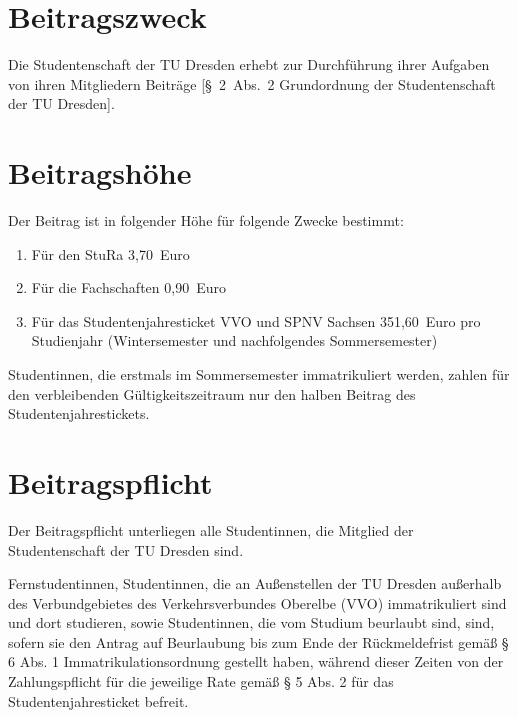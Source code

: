 

\setcounter{section}{0}
\begin{multicols}{2}
 

\section{Beitragszweck}

\Abs \Satz  Die Studentenschaft der TU Dresden erhebt zur Durchführung ihrer Aufgaben von ihren Mitgliedern Beiträge [§~2~Abs.~2 Grundordnung der Studentenschaft der TU Dresden]. 

\section{Beitragshöhe}

\Abs \Satz  Der Beitrag ist in folgender Höhe für folgende Zwecke bestimmt:
\begin{enumerate}
\item Für den StuRa 3,70~Euro
\item Für die Fachschaften 0,90~Euro
\item Für das Studentenjahresticket VVO und SPNV Sachsen 351,60~Euro pro Studienjahr (Wintersemester und nachfolgendes Sommersemester)
\end{enumerate}

\Abs \Satz  Studentinnen, die erstmals im Sommersemester immatrikuliert werden, zahlen für den verbleibenden Gültigkeitszeitraum nur den halben Beitrag des Studentenjahrestickets. 


\section{Beitragspflicht}

\Abs \Satz  Der Beitragspflicht unterliegen alle Studentinnen, die Mitglied der Studentenschaft der TU Dresden sind.

\Abs \Satz  Fernstudentinnen, Studentinnen, die an Außenstellen der TU Dresden außerhalb des Verbundgebietes des Verkehrsverbundes Oberelbe (VVO) immatrikuliert sind und dort studieren, sowie Studentinnen, die vom Studium beurlaubt sind, sind, sofern sie den Antrag auf Beurlaubung bis zum Ende der Rückmeldefrist gemäß § 6 Abs. 1 Immatrikulationsordnung gestellt haben, während dieser Zeiten von der Zahlungspflicht für die jeweilige Rate gemäß § 5 Abs. 2 für das Studentenjahresticket befreit.



\end{multicols}

